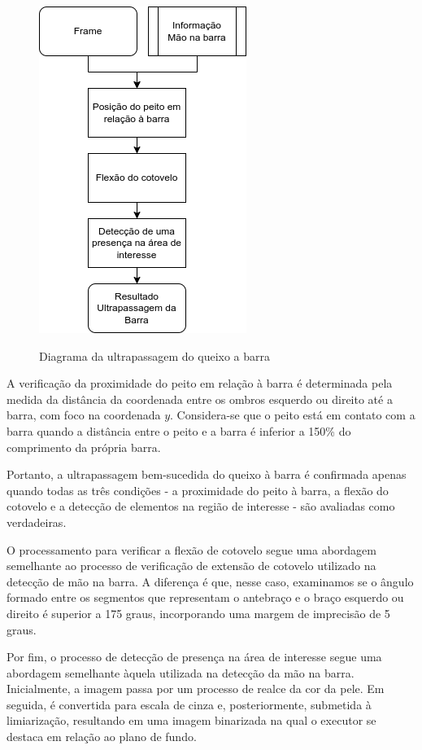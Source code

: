 \begin{figure}[H]
	\centering
    \caption{Diagrama da ultrapassagem do queixo a barra}
	\includegraphics[scale=0.75]{figuras/diagrama/ultrapassagem_barra.png}
	\label{dia:ultrapassagem}
\end{figure}


A verificação da proximidade do peito em relação à barra é determinada pela medida da distância da coordenada entre os ombros esquerdo ou direito até a barra, com foco na coordenada $y$. Considera-se que o peito está em contato com a barra quando a distância entre o peito e a barra é inferior a 150\% do comprimento da própria barra.

Portanto, a ultrapassagem bem-sucedida do queixo à barra é confirmada apenas quando todas as três condições - a proximidade do peito à barra, a flexão do cotovelo e a detecção de elementos na região de interesse - são avaliadas como verdadeiras.

O processamento para verificar a flexão de cotovelo segue uma abordagem semelhante ao processo de verificação de extensão de cotovelo utilizado na detecção de mão na barra. A diferença é que, nesse caso, examinamos se o ângulo formado entre os segmentos que representam o antebraço e o braço esquerdo ou direito é superior a 175 graus, incorporando uma margem de imprecisão de 5 graus.

Por fim, o processo de detecção de presença na área de interesse segue uma abordagem semelhante àquela utilizada na detecção da mão na barra. Inicialmente, a imagem passa por um processo de realce da cor da pele. Em seguida, é convertida para escala de cinza e, posteriormente, submetida à limiarização, resultando em uma imagem binarizada na qual o executor se destaca em relação ao plano de fundo.

